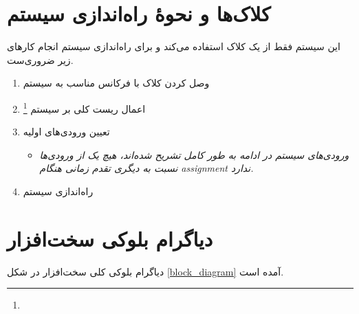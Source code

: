 \section{کلاک‌ها و نحوهٔ راه‌اندازی سیستم}
این سیستم فقط از یک کلاک استفاده می‌کند و برای راه‌اندازی سیستم انجام کارهای زیر ضروری‌ست.
\begin{enumerate}
	\item
	      وصل کردن کلاک با فرکانس مناسب به سیستم
	\item
	      اعمال ریست‌ کلی بر سیستم
	      \footnote{}
	\item 
	      تعیین ورودی‌های اولیه
	      \begin{itemize}
	      \item
				\textit{ ورودی‌های سیستم در ادامه به طور کامل تشریح شده‌اند، هیچ یک از ورودی‌ها نسبت به دیگری تقدم 				زمانی هنگام assignment ندارد.}
	      \end{itemize}
	
	\item 
	      راه‌اندازی سیستم 
\end{enumerate}


\section{دیاگرام بلوکی سخت‌افزار}
دیاگرام بلوکی کلی سخت‌افزار در شکل 
\ref{block_diagram}
آمده است. 

